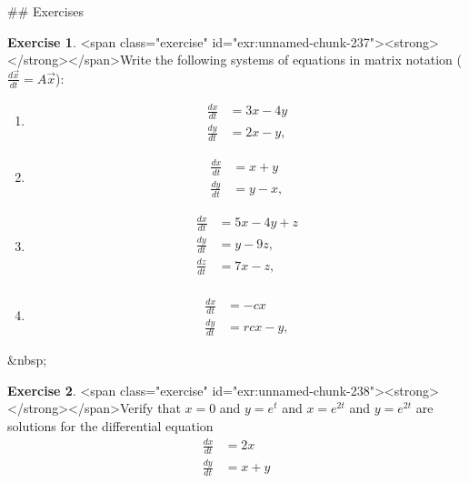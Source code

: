 \documentclass[
]{book}
\theoremstyle{definition}
\theoremstyle{definition}
\theoremstyle{definition}
\newtheorem{exercise}{Exercise}[chapter]
\theoremstyle{remark}
\begin{document}
## Exercises
\begin{exercise}
<span class="exercise" id="exr:unnamed-chunk-237"><strong>\label{exr:unnamed-chunk-237} </strong></span>Write the following systems of equations in matrix notation ($\displaystyle \frac{ d \vec{x} }{dt} = A \vec{x}$):
  
\begin{enumerate}[label=\alph*.]
\item  \begin{equation}
\begin{split}
\frac{dx}{dt} &= 3x-4y \\ 
\frac{dy}{dt} &= 2x-y,
\end{split}
\end{equation}

\item  \begin{equation}
\begin{split}
\frac{dx}{dt} &= x+y \\ 
\frac{dy}{dt} &= y-x,
\end{split}
\end{equation}


\item  \begin{equation}
\begin{split}
\frac{dx}{dt} &= 5x-4y + z \\ 
\frac{dy}{dt} &= y - 9z, \\
\frac{dz}{dt} &= 7x-z, \\
\end{split}
\end{equation}

\item  \begin{equation}
\begin{split}
\frac{dx}{dt} &= -cx \\ 
\frac{dy}{dt} &= rcx-y,
\end{split}
\end{equation}

\end{enumerate}
  
\end{exercise}

&nbsp;

\begin{exercise}
<span class="exercise" id="exr:unnamed-chunk-238"><strong>\label{exr:unnamed-chunk-238} </strong></span>Verify that $x=0$ and $y =e^{t}$ and  $x=e^{2t}$ and $y=e^{2t}$ are solutions for the differential equation 
\begin{equation}
\begin{split}
\frac{dx}{dt} &= 2x \\ 
\frac{dy}{dt} &= x+y
\end{split}
\end{equation}
\end{exercise}
\end{document}
